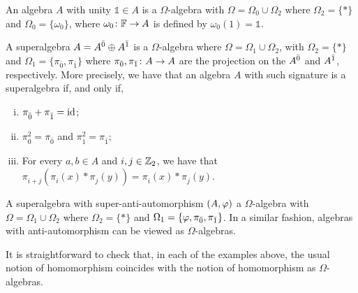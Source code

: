 \begin{ex}
    An algebra $A$ with unity $\mathds{1} \in A$ is a  $\Omega$-algebra with $\Omega = \Omega_0 \cup \Omega_2$ where $\Omega_2 = \{ * \}$ and $\Omega_0 = \{ \omega_0 \}$, where $\omega_0\colon \mathbb{F} \to A$ is defined by $\omega_0 (1) = \mathds 1$.
\end{ex}

\begin{ex}\label{ex:omega-alg-SA}
    A superalgebra $A = A^{\bar0} \oplus A^{\bar1}$ is a $\Omega$-algebra where $\Omega = \Omega_1 \cup \Omega_2$, with $\Omega_2 = \{ * \}$ and $\Omega_1 = \{ \pi_{\bar 0}, \pi_{\bar 1} \}$ where $\pi_{\bar 0}, \pi_{\bar 1}\colon A \to A$ are the projection on the $A^{\bar0}$ and $A^{\bar1}$, respectively. 
    More precisely, we have that an algebra $A$ with such signature is a superalgebra if, and only if,
    \begin{enumerate}[(i)]
        \item $\pi_{\bar 0}^{} + \pi_{\bar 1}^{} = \operatorname{id}$; \label{item:sum-projections}
        \item $\pi_{\bar 0}^2 = \pi_{\bar 0}^{}$ and $\pi_{\bar 1}^2 = \pi_{\bar 1}^{}$;
        \item For every $a,b \in A$ and $i, j\in \mathbb{Z}_2$, we have that $\pi_{i+j}^{}( \pi_i^{} (x)*\pi_j^{} (y) ) = \pi_i^{} (x)*\pi_j^{} (y)$.
    \end{enumerate}
\end{ex}


\begin{ex}
    A superalgebra with super-anti-automorphism $(A, \varphi)$ a $\Omega$-algebra with $\Omega = \Omega_1 \cup \Omega_2$ where $\Omega_2 = \{ * \}$ and $\Omega_1 = \{ \varphi, \pi_{\bar 0}, \pi_{\bar 1} \}$. 
    In a similar fashion, algebras with anti-automorphism can be viewed as $\Omega$-algebras.
\end{ex}

It is straightforward to check that, in each of the examples above, the usual notion of homomorphism coincides with the notion of homomorphism as $\Omega$-algebras.

